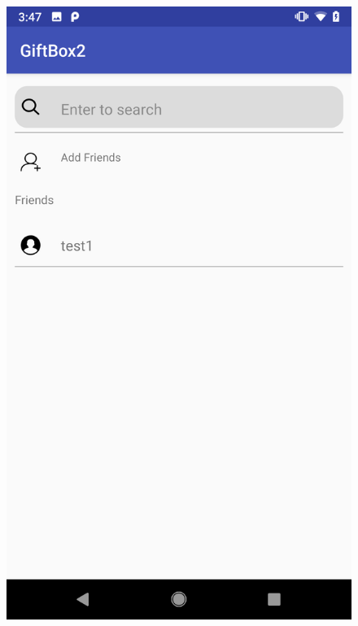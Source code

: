 \begin{figure}[H]
\centering
\begin{minipage}[t]{0.27\textwidth}
\includegraphics[width=.95\textwidth]{section03/assets/FriendsList.png}
\subcaption{\label{FriendsListUI}}
\end{minipage}%
\begin{minipage}[t]{0.27\textwidth}

\end{minipage}
\end{figure}
